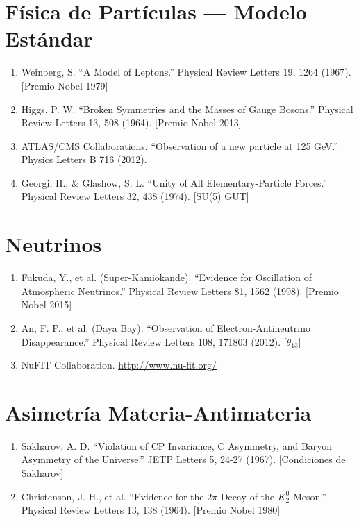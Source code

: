\section{Física de Partículas --- Modelo Estándar}

\begin{enumerate}
    \item Weinberg, S. ``A Model of Leptons.'' Physical Review Letters 19, 1264 (1967). [Premio Nobel 1979]

    \item Higgs, P. W. ``Broken Symmetries and the Masses of Gauge Bosons.'' Physical Review Letters 13, 508 (1964). [Premio Nobel 2013]

    \item ATLAS/CMS Collaborations. ``Observation of a new particle at 125 GeV.'' Physics Letters B 716 (2012).

    \item Georgi, H., \& Glashow, S. L. ``Unity of All Elementary-Particle Forces.'' Physical Review Letters 32, 438 (1974). [SU(5) GUT]
\end{enumerate}


\section{Neutrinos}

\begin{enumerate}
    \item Fukuda, Y., et al. (Super-Kamiokande). ``Evidence for Oscillation of Atmospheric Neutrinos.'' Physical Review Letters 81, 1562 (1998). [Premio Nobel 2015]

    \item An, F. P., et al. (Daya Bay). ``Observation of Electron-Antineutrino Disappearance.'' Physical Review Letters 108, 171803 (2012). [$\theta_{13}$]

    \item NuFIT Collaboration. \url{http://www.nu-fit.org/}
\end{enumerate}


\section{Asimetría Materia-Antimateria}

\begin{enumerate}
    \item Sakharov, A. D. ``Violation of CP Invariance, C Asymmetry, and Baryon Asymmetry of the Universe.'' JETP Letters 5, 24-27 (1967). [Condiciones de Sakharov]

    \item Christenson, J. H., et al. ``Evidence for the $2\pi$ Decay of the $K_2^0$ Meson.'' Physical Review Letters 13, 138 (1964). [Premio Nobel 1980]
\end{enumerate}


